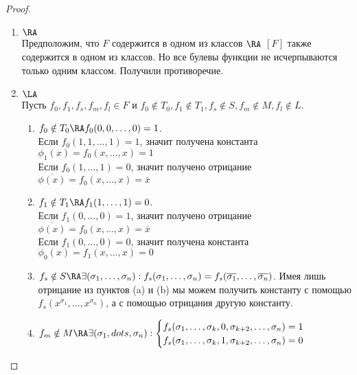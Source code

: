 \documentclass[a4paper, 14pt]{article}
\begin{document}
    \begin{proof}
        \begin{enumerate}
            \item $\RA$ \\
            Предположим, что $F$ содержится в одном из классов $\RA$ $[F]$
            также содержится в одном из классов. Но все булевы функции не 
            исчерпываются только одним классом. Получили противоречие.
            \item $\LA$ \\
            Пусть $f_0, f_1, f_s, f_m, f_l \in F$ и $f_0 \notin T_0, 
            f_1 \notin T_1, f_s \notin S, f_m \notin M, f_l \notin L$.

            \begin{enumerate}
                \item $f_0 \notin T_0 \RA f_0(0,0,\dots, 0) = 1$. \\
                Если $f_0(1, 1, \dots, 1) = 1$, значит получена константа
                $\phi_1(x) = f_0(x, \dots, x) = 1$ \\
                Если $f_0(1, \dots, 1) = 0$, значит получено отрицание
                $\overline{\phi(x)} = f_0(x, \dots, x) = \overline{x}$

                \item $f_1 \notin T_1 \RA f_1(1, \dots, 1) = 0$. \\
                Если $f_1(0, \dots, 0) = 1$, значит получено отрицание
                $\overline{\phi(x)} = f_0(x, \dots, x) = \overline{x}$ \\
                Если $f_1(0, \dots, 0) = 0$, значит получена константа
                $\phi_0(x) = f_1(x, \dots, x) = 0$

                \item $f_s \notin S \RA \exists (\sigma_1, \dots, \sigma_n) : f_s(\sigma_1, \dots, \sigma_n) = f_s(\overline{\sigma_1}, \dots, \overline{\sigma_n})$.  
                Имея лишь отрицание из пунктов (a) и (b) мы можем получить константу с помощью
                $f_s(x^{\sigma_1}, \dots, x^{\sigma_n})$, а с помощью отрицания другую константу.

                \item $f_m \notin M \RA \exists (\sigma_1, dots, \sigma_n) : 
                \begin{cases}
                    f_s(\sigma_1, \dots, \sigma_k, 0, \sigma_{k+2}, \dots, \sigma_n) = 1 \\
                    f_s(\sigma_1, \dots, \sigma_k, 1, \sigma_{k+2}, \dots, \sigma_n) = 0
                \end{cases}$


\end{enumerate}
\end{enumerate}
\end{proof}
\end{document}
